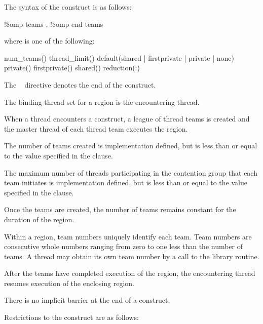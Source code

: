 \fortranspecificstart
The syntax of the  construct is as follows:

\begin{boxedcode}
!\$omp teams \plc{[clause[ [},\plc{] clause] ... ]}
!\$omp end teams
\end{boxedcode}

where  is one of the following:

\begin{indentedcodelist}
num\_teams()
thread\_limit()
default(shared \textnormal{|} firstprivate \textnormal{|} private \textnormal{|} none)
private()
firstprivate()
shared()
reduction(:)
\end{indentedcodelist}

The ~ directive denotes the end of the  construct.
\fortranspecificend

\binding
The binding thread set for a  region is the encountering thread.

\descr
When a thread encounters a  construct, a league of thread teams is created and 
the master thread of each thread team executes the  region.

The number of teams created is implementation defined, but is less than or equal to the 
value specified in the  clause.

The maximum number of threads participating in the contention group that each team 
initiates is implementation defined, but is less than or equal to the value specified in the 
 clause.

Once the teams are created, the number of teams remains constant for the duration of the 
 region.

Within a  region, team numbers uniquely identify each team. Team numbers are 
consecutive whole numbers ranging from zero to one less than the number of teams. A 
thread may obtain its own team number by a call to the  library 
routine.

After the teams have completed execution of the  region, the encountering thread 
resumes execution of the enclosing  region.

There is no implicit barrier at the end of a  construct.

\restrictions
Restrictions to the  construct are as follows:

